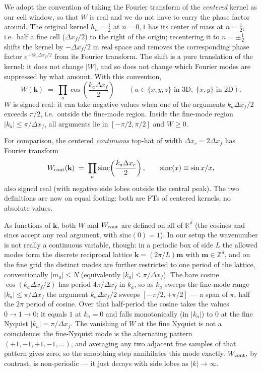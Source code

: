 \documentclass[12pt]{article}
\begin{document}
We adopt the convention of taking the Fourier transform of the
\emph{centered} kernel as our cell window, so that $W$ is real and we
do not have to carry the phase factor around. The original kernel
$h_n=\tfrac12$ at $n=0,1$ has its center of mass at $n=\tfrac12$, i.e.\
half a fine cell ($\Delta x_f/2$) to the right of the origin; recentering it
to $n=\pm\tfrac12$ shifts the kernel by $-\Delta x_f/2$ in real space
and removes the corresponding phase factor
$e^{-ik_a\Delta x_f/2}$ from its Fourier transform. The shift is a
pure translation of the kernel: it does not change $|W|$, and so does
not change which Fourier modes are suppressed by what amount. With this convention,
\begin{equation}\label{eq:Wcell}
  W(\mathbf k) \;=\; \prod_a \cos\!\left(\frac{k_a\Delta x_f}{2}\right)
  \qquad (a\in\{x,y,z\}\text{ in 3D},\; \{x,y\}\text{ in 2D}).
\end{equation}
$W$ is signed real: it can take negative values when one of the
arguments $k_a\Delta x_f/2$ exceeds $\pi/2$, i.e.\ outside the
fine-mode region. Inside the fine-mode region $|k_a|\le\pi/\Delta x_f$,
all arguments lie in $[-\pi/2,\pi/2]$ and $W\ge 0$.

For comparison, the centered \emph{continuous} top-hat of width
$\Delta x_c=2\Delta x_f$ has Fourier transform
\begin{equation}
  W_{\rm cont}(\mathbf k) \;=\; \prod_a \mathrm{sinc}\!\left(\frac{k_a\Delta x_c}{2}\right),
  \qquad \mathrm{sinc}(x)\equiv \sin x/x,
\end{equation}
also signed real (with negative side lobes outside the central peak).
The two definitions are now on equal footing: both are FTs of centered
kernels, no absolute values.

As functions of $\mathbf k$, both $W$ and $W_{\rm cont}$ are defined on
all of $\mathbb R^d$ (the cosines and sincs accept any real argument,
with $\mathrm{sinc}(0)=1$). In our setup the wavenumber is not really
a continuous variable, though: in a periodic box of side $L$ the
allowed modes form the discrete reciprocal lattice $\mathbf k =(2\pi/L)\mathbf m$
with $\mathbf m\in\mathbb Z^d$, and on the fine grid the distinct modes
are further restricted to one period of the lattice, conventionally
$|m_a|\le N$ (equivalently $|k_a|\le\pi/\Delta x_f$). The bare cosine
$\cos(k_a\Delta x_f/2)$ has period $4\pi/\Delta x_f$ in $k_a$, so as
$k_a$ sweeps the fine-mode range $|k_a|\le\pi/\Delta x_f$ the argument
$k_a\Delta x_f/2$ sweeps $[-\pi/2,+\pi/2]$ --- a span of $\pi$, half
the $2\pi$ period of cosine. Over that half-period the cosine takes
the values $0\to 1\to 0$: it equals $1$ at $k_a=0$ and falls
monotonically (in $|k_a|$) to $0$ at the fine Nyquist
$|k_a|=\pi/\Delta x_f$. The vanishing of $W$ at the fine Nyquist is
not a coincidence: the fine-Nyquist mode is the alternating pattern
$(+1,-1,+1,-1,\dots)$, and averaging any two adjacent fine samples of
that pattern gives zero, so the smoothing step annihilates this mode
exactly. $W_{\rm cont}$, by contrast, is non-periodic --- it just
decays with side lobes as $|k|\to\infty$.
\end{document}

